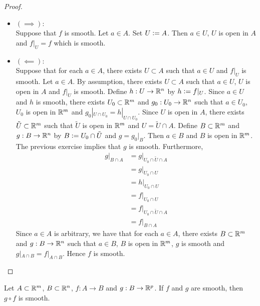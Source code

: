 \documentclass{book}
\begin{document}
	\begin{proof} \
		\begin{itemize}
			\item $(\implies): $ \\
			Suppose that $f$ is smooth. Let $a \in A$. Set $U \vcentcolon= A$. Then $a \in U$, $U$ is open in $A$ and $f|_U = f$ which is smooth. 
			\item $(\impliedby): $ \\
			Suppose that for each $a \in A$, there exists $U \subset A$ such that $a \in U$ and $f|_U$ is smooth. Let $a \in A$. By assumption, there exists $U \subset A$ such that $a \in U$, $U$ is open in $A$ and $f|_U$ is smooth. Define $h:U \rightarrow \mathbb{R}^n$ by $h \vcentcolon= f|_U$. Since $a \in U$ and $h$ is smooth, there exists $U_0 \subset \mathbb{R}^m$ and $g_0:U_0 \rightarrow \mathbb{R}^n$ such that $a \in U_0$, $U_0$ is open in $\mathbb{R}^m$ and $g_0|_{U \cap U_0} = h|_{U \cap U_0}$. Since $U$ is open in $A$, there exists $\tilde{U} \subset \mathbb{R}^m$ such that $\tilde{U}$ is open in $\mathbb{R}^m$ and $U = \tilde{U} \cap A$. Define $B \subset \mathbb{R}^m$ and $g:B \rightarrow \mathbb{R}^n$ by $B \vcentcolon= U_0 \cap \tilde{U}$ and $g = g_0|_B$. Then $a \in B$ and $B$ is open in $\mathbb{R}^m$. The previous exercise implies that $g$ is smooth. Furthermore,
			\begin{align*}
				g|_{B \cap A}
				& = g|_{U_0 \cap \tilde{U} \cap A} \\
				& = g|_{U_0 \cap U} \\
				& = h|_{U_0 \cap U} \\
				& = f|_{U_0 \cap U} \\
				& = f|_{U_0 \cap \tilde{U} \cap A} \\
				& = f|_{B \cap A} 
			\end{align*}
			Since $a \in A$ is arbitrary, we have that for each $a \in A$, there exists $B \subset \mathbb{R}^m$ and $g:B \rightarrow \mathbb{R}^n$ such that $a \in B$, $B$ is open in $\mathbb{R}^m$, $g$ is smooth and $g|_{A \cap B} = f|_{A \cap B}$. Hence $f$ is smooth.
		\end{itemize}
	\end{proof}
	
	\begin{ex} 
		Let $A \subset \mathbb{R}^m$, $B \subset \mathbb{R}^n$, $f:A \rightarrow B$ and $g: B \rightarrow \mathbb{R}^p$. If $f$ and $g$ are smooth, then $g \circ f$ is smooth.
	\end{ex}
	
\end{document}
